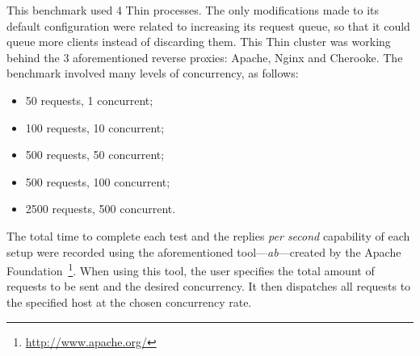 This benchmark used 4 Thin processes. The only modifications made to its default configuration were related to increasing its request queue, so that it could queue more clients instead of discarding them. This Thin cluster was working behind the 3 aforementioned reverse proxies: Apache, Nginx and Cherooke. The benchmark involved many levels of concurrency, as follows:
\begin{itemize}
  \item 50 requests, 1 concurrent;
  \item 100 requests, 10 concurrent;
  \item 500 requests, 50 concurrent;
  \item 500 requests, 100 concurrent;
  \item 2500 requests, 500 concurrent.
\end{itemize}
The total time to complete each test and the replies \textit{per second} capability of each setup were recorded using the aforementioned tool---\textit{ab}---created by the Apache Foundation~\footnote{\url{http://www.apache.org/}}. When using this tool, the user specifies the total amount of requests to be sent and the desired concurrency. It then dispatches all requests to the specified host at the chosen concurrency rate.

